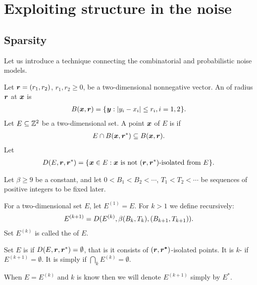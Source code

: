 \documentclass[12pt]{memoir}
\renewcommand{\le}{\leq}
\def\B{B}
\newcommand{\Tu}{T}
\newcommand{\Z}{Z}
\begin{document}


\section{Exploiting structure in the noise}\label{sec:noise}

\subsection{Sparsity}
Let us introduce a technique connecting the combinatorial and probabilistic
noise models.

\begin{definition}
Let \( \boldsymbol{r}=(r_1,r_2) \), \( r_1, r_2\ge 0 \),
be a two-dimensional nonnegative vector.
An  of radius \( \boldsymbol{r} \)  at \( \boldsymbol{x} \) is
\begin{align}\label{eq:ball1}
  B(\vek{x},\vek{r}) = \setOf{\vek{y}}{|y_i - x_i| \le r_i, i=1,2}.
\end{align}  
Let \( E\subseteq \mathbb{Z}^{2} \) be a two-dimensional set.
A point \( \boldsymbol{x} \) of \( E \) is  if
\begin{align*}
  E \cap B(\boldsymbol{x},\boldsymbol{r}^*)\subseteq B(\boldsymbol{x}, \boldsymbol{r}).
 \end{align*}
  Let
\begin{align}
  D(E,\boldsymbol{r}, \boldsymbol{r}^*) =
     \mathopen\{\mskip 1mu\boldsymbol{x}\in E : \boldsymbol{x} \text{\rmfamily\mdseries\upshape{ is not }} (\boldsymbol{r}, \boldsymbol{r}^*)\text{\rmfamily\mdseries\upshape{-isolated
  from }} E\mskip 1mu\mathclose\}.
\end{align}
\end{definition}

\begin{definition}[Sparsity]\label{def:sparsity}
Let \( \beta\ge 9 \) be a constant, and let 
\( 0<\B_{1}<\B_{2}<\dotsm \), \( \Tu_{1}<\Tu_{2}<\dotsm \) be 
sequences of positive integers to be fixed later.

For a two-dimensional set \( E \), let \( E^{(1)} = E \).
For \( k>1 \) we define recursively:
\begin{align}\label{eq:noise^k}
    E^{(k+1)} = D(E^{(k)}, \beta\pair{\B_k}{\Tu_{k}}, \pair{\B_{k+1}}{\Tu_{k+1}}).
\end{align}
Set \( E^{(k)} \) is called the  of \( E \).

Set \( E \) is  
if \( D(E, \boldsymbol{r}, \boldsymbol{r}^*)=\emptyset \), that is 
it consists of \( (\boldsymbol{r}, \boldsymbol{r^*}) \)-isolated points.
It is \( k \)- if \( E^{(k+1)}=\emptyset \).
It is simply  if \( \bigcap_{k}E^{(k)}=\emptyset \).

When \( E=E^{(k)} \) and \( k \) is know then we will denote \( E^{(k+1)} \) simply by \( E^{*} \).
\end{definition}
\end{document}
